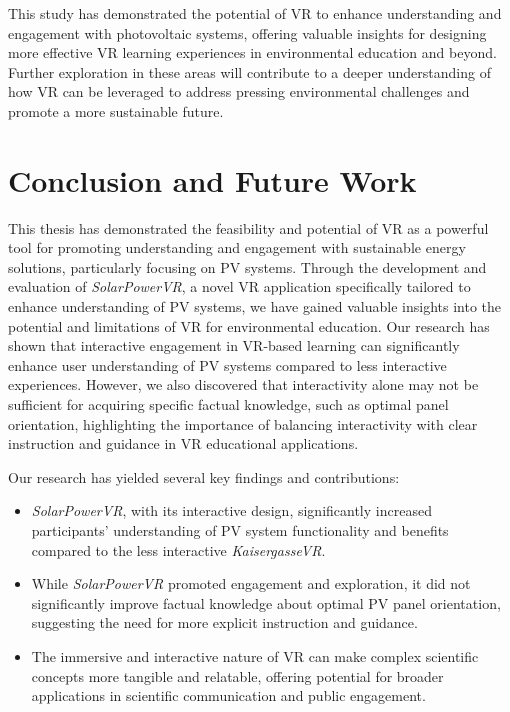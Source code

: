 \documentclass[draft, final]{vutinfth} %
\begin{document}
This study has demonstrated the potential of VR to enhance understanding and engagement with photovoltaic systems, offering valuable insights for designing more effective VR learning experiences in environmental education and beyond. Further exploration in these areas will contribute to a deeper understanding of how VR can be leveraged to address pressing environmental challenges and promote a more sustainable future.

\chapter{Conclusion and Future Work}

This thesis has demonstrated the feasibility and potential of VR as a powerful tool for promoting understanding and engagement with sustainable energy solutions, particularly focusing on PV systems. Through the development and evaluation of \textit{SolarPowerVR}, a novel VR application specifically tailored to enhance understanding of PV systems, we have gained valuable insights into the potential and limitations of VR for environmental education. Our research has shown that interactive engagement in VR-based learning can significantly enhance user understanding of PV systems compared to less interactive experiences. However, we also discovered that interactivity alone may not be sufficient for acquiring specific factual knowledge, such as optimal panel orientation, highlighting the importance of balancing interactivity with clear instruction and guidance in VR educational applications. 

Our research has yielded several key findings and contributions:

\begin{itemize}
    \item \textit{SolarPowerVR}, with its interactive design, significantly increased participants' understanding of PV system functionality and benefits compared to the less interactive \textit{KaisergasseVR}.
    \item While \textit{SolarPowerVR} promoted engagement and exploration, it did not significantly improve factual knowledge about optimal PV panel orientation, suggesting the need for more explicit instruction and guidance.
    \item The immersive and interactive nature of VR can make complex scientific concepts more tangible and relatable, offering potential for broader applications in scientific communication and public engagement.
\end{itemize}
\end{document}
